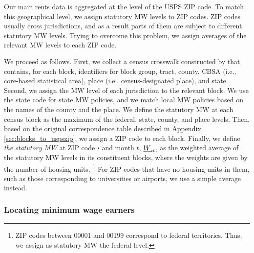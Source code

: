 Our main rents data is aggregated at the level of the USPS ZIP code.
To match this geographical level, we assign statutory MW levels to ZIP codes.
ZIP codes usually cross jurisdictions, and as a result parts of them are subject
to different statutory MW levels.
Trying to overcome this problem, we assign averages of the relevant MW levels to
each ZIP code.

We proceed as follows.
First, we collect a census crosswalk constructed by \textcite{CensusLODES} that 
contains, for each block, identifiers for block group, tract, county, CBSA 
(i.e., core-based statistical area), place (i.e., census-designated place), and 
state.
Second, we assign the MW level of each jurisdiction to the relevant block.
We use the state code for state MW policies, and we match local MW policies 
based on the names of the county and the place.
We define the statutory MW at each census block as the maximum of the federal,
state, county, and place levels.
Then, based on the original correspondence table described in Appendix 
\ref{sec:blocks_to_uspszip}, we assign a ZIP code to each block.
Finally, we define \textit{the statutory MW} at ZIP code $i$ and month $t$, 
$\underline{W}_{it}$, as the weighted average of the statutory MW levels in its
constituent blocks, where the weights are given by the number of housing 
units.%
\footnote{ZIP codes between 00001 and 00199 correspond to federal territories.
Thus, we assign as statutory MW the federal level.}
For ZIP codes that have no housing units in them, such as those corresponding to 
universities or airports, we use a simple average instead.

\subsubsection*{Locating minimum wage earners}

